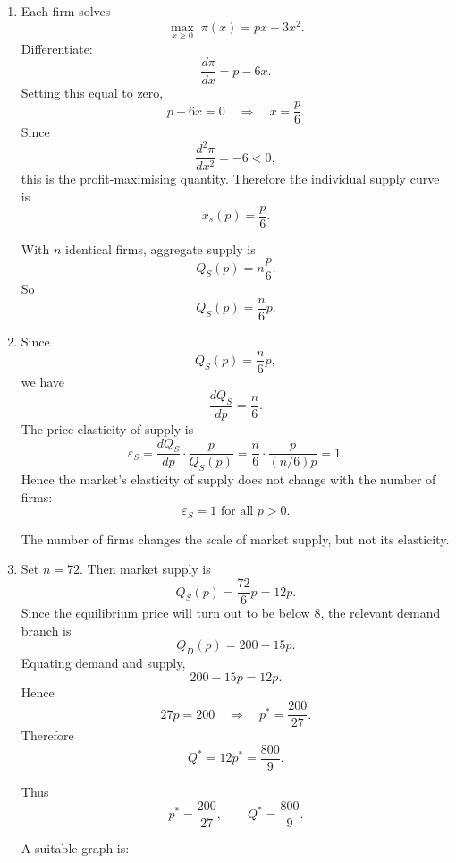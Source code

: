 \documentclass[12pt]{article}
\begin{document}
\begin{enumerate}[label=(\alph*)]
    For \(8<p\le 16\), only Type 1 buys:
    \[
    Q_D(p)=80\left(2-\frac{p}{8}\right)=160-10p.
    \]

    For \(p>16\), nobody buys:
    \[
    Q_D(p)=0.
    \]

    Hence
    \[
    \boxed{
    Q_D(p)=
    \begin{cases}
    200-15p, & 0\le p\le 8,\\[0.4em]
    160-10p, & 8<p\le 16,\\[0.4em]
    0, & p>16.
    \end{cases}}
    \]

    \item
    Each firm solves
    \[
    \max_{x\ge 0}\; \pi(x)=px-3x^2.
    \]
    Differentiate:
    \[
    \frac{d\pi}{dx}=p-6x.
    \]
    Setting this equal to zero,
    \[
    p-6x=0
    \quad\Longrightarrow\quad
    x=\frac{p}{6}.
    \]
    Since
    \[
    \frac{d^2\pi}{dx^2}=-6<0,
    \]
    this is the profit-maximising quantity. Therefore the individual supply curve is
    \[
    \boxed{x_s(p)=\frac{p}{6}.}
    \]

    With \(n\) identical firms, aggregate supply is
    \[
    Q_S(p)=n\frac{p}{6}.
    \]
    So
    \[
    \boxed{Q_S(p)=\frac{n}{6}p.}
    \]

    \item
    Since
    \[
    Q_S(p)=\frac{n}{6}p,
    \]
    we have
    \[
    \frac{dQ_S}{dp}=\frac{n}{6}.
    \]
    The price elasticity of supply is
    \[
    \varepsilon_S=\frac{dQ_S}{dp}\cdot \frac{p}{Q_S(p)}
    =\frac{n}{6}\cdot \frac{p}{(n/6)p}=1.
    \]
    Hence the market’s elasticity of supply does not change with the number of firms:
    \[
    \boxed{\varepsilon_S=1\text{ for all }p>0.}
    \]

    The number of firms changes the scale of market supply, but not its elasticity.

    \item
    Set \(n=72\). Then market supply is
    \[
    Q_S(p)=\frac{72}{6}p=12p.
    \]
    Since the equilibrium price will turn out to be below 8, the relevant demand branch is
    \[
    Q_D(p)=200-15p.
    \]
    Equating demand and supply,
    \[
    200-15p=12p.
    \]
    Hence
    \[
    27p=200
    \quad\Longrightarrow\quad
    p^*=\frac{200}{27}.
    \]
    Therefore
    \[
    Q^*=12p^*=\frac{800}{9}.
    \]

    Thus
    \[
    \boxed{p^*=\frac{200}{27},\qquad Q^*=\frac{800}{9}.}
    \]

    A suitable graph is:


\end{enumerate}
\end{document}
